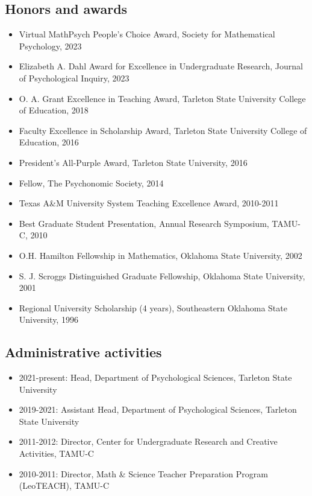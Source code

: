 \documentclass[article,10pt]{article}
\begin{document}
\subsection*{Honors and awards}
\label{sec:org395e96e}
\begin{itemize}
\item Virtual MathPsych People's Choice Award, Society for Mathematical Psychology, 2023
\item Elizabeth A. Dahl Award for Excellence in Undergraduate Research, Journal of Psychological Inquiry, 2023
\item O. A. Grant Excellence in Teaching Award, Tarleton State University College of Education, 2018
\item Faculty Excellence in Scholarship Award, Tarleton State University College of Education, 2016
\item President's All-Purple Award, Tarleton State University, 2016
\item Fellow, The Psychonomic Society, 2014
\item Texas A\&M University System Teaching Excellence Award, 2010-2011
\item Best Graduate Student Presentation, Annual Research Symposium, TAMU-C, 2010
\item O.H. Hamilton Fellowship in Mathematics, Oklahoma State University, 2002
\item S. J. Scroggs Distinguished Graduate Fellowship, Oklahoma State University, 2001
\item Regional University Scholarship (4 years), Southeastern Oklahoma State University, 1996
\end{itemize}

\subsection*{Administrative activities}
\label{sec:org67b3eae}
\begin{itemize}
\item 2021-present: Head, Department of Psychological Sciences, Tarleton State University
\item 2019-2021: Assistant Head, Department of Psychological Sciences, Tarleton State University
\item 2011-2012: Director, Center for Undergraduate Research and Creative Activities, TAMU-C
\item 2010-2011: Director, Math \& Science Teacher Preparation Program (LeoTEACH), TAMU-C
\end{itemize}
\end{document}
